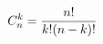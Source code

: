 \documentclass[preview]{standalone}
\begin{document}
\begin{align*}
\special{dvisvgm:raw <g id='unique000'>}C_n^k=\frac{n!}{k!(n-k)!}\special{dvisvgm:raw </g>}
\end{align*}
\end{document}
